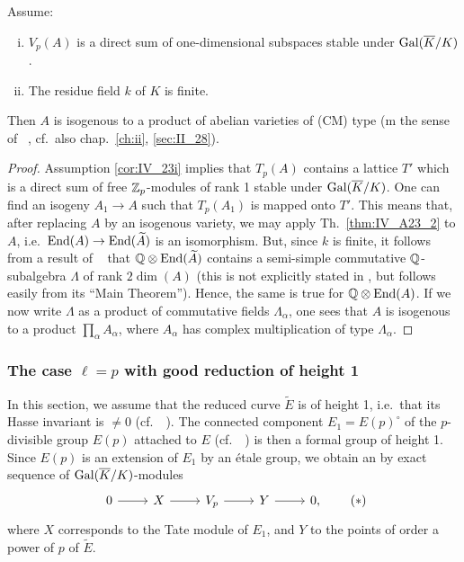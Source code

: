 \begin{subappendices}
\begin{cor}\label{cor:IV_A23_2}
	Assume:
	\begin{enumerate}[(i)]
		\item\label{cor:IV_23i}
			$V_p(A)$ is a direct sum of one-dimensional subspaces
			stable under $\operatorname{Gal}(\overline{K}/K)$.
		\item\label{cor:IV_23ii}
			The residue field $k$ of $K$ is finite.
	\end{enumerate}
	Then $A$ is isogenous to a product of abelian varieties of (CM) type (m
	the sense of \citeauthor{34}~\cite{34}, cf.\ also chap.~\ref{ch:ii},
	\ref{sec:II_28}).
\end{cor}
\begin{proof}
	Assumption \ref{cor:IV_23i} implies that $T_p(A)$ contains a lattice
	$T'$ which is a direct sum of free $\mathbb{Z}_p$-modules of rank 1 stable
	under $\operatorname{Gal}(\overline{K}/K)$. One can find an isogeny $A_1 \to A$ such that
	$T_p(A_1)$ is mapped onto $T'$. This means that, after replacing $A$ by
	an isogenous variety, we may apply Th.~\ref{thm:IV_A23_2} to $A$, i.e.\
	$\operatorname{End}(A) \to \operatorname{End}(\widetilde A)$ is an isomorphism. But, since $k$ is
	finite, it follows from a result of \citeauthor{38}~\cite{38} that $\mathbb{Q}
	\otimes \operatorname{End}(\widetilde A)$ contains a semi-simple commutative\break
	$\mathbb{Q}$-subalgebra $\Lambda$ of rank $2 \dim(A)$ (this is not explicitly
	stated in \cite{38}, but follows easily from its ``Main Theorem'').
	Hence, the same is true for $\mathbb{Q} \otimes \operatorname{End}(A)$. If we now write
	$\Lambda$ as a product of commutative fields $\Lambda_\alpha$, one sees
	that $A$ is isogenous to a product $\prod_{\alpha} A_\alpha$, where
	$A_\alpha$ has complex multiplication of type $\Lambda_\alpha$.
\end{proof}

\subsubsection{The case \texorpdfstring{$\ell = p$}{ℓ = p} with good reduction
of height 1}
\label{sec:IV_A24}
In this section, we assume that the reduced curve $\widetilde{E}$ is of
height 1, i.e.\ that its Hasse invariant is $\ne 0$ (cf.\
\citeauthor{9}~\cite{9}). The connected component $E_1 = E(p)^\circ$ of the
$p$-divisible group $E(p)$
\dpage
attached to $E$ (cf.\ \citeauthor{39}~\cite{39}) is then a formal group of
height 1.
Since $E(p)$ is an extension of $E_1$ by an étale group, we obtain an by exact
sequence of $\operatorname{Gal}(\overline{K}/K)$-modules
\begin{equation}
	\begin{tikzcd}
		0 \rar & X \rar & V_p \rar & Y \rar & 0,
	\end{tikzcd}
	\tag{$*$}
	\label{eqn:IV_A24}
\end{equation}
where $X$ corresponds to the Tate module of $E_1$, and $Y$ to the
points of order a power of $p$ of $\widetilde{E}$.
\todo[bluetask]{Update notation?}


\end{subappendices}
